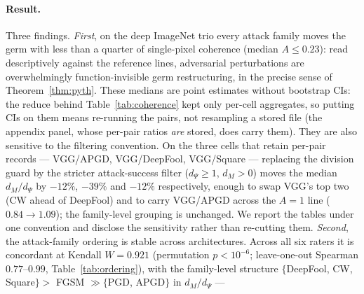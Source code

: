 \paragraph{Result.}
Three findings. \emph{First}, on the deep ImageNet trio every attack
family moves the germ with less than a quarter of single-pixel coherence
(median $A\le0.23$): read descriptively against the reference lines,
adversarial perturbations are overwhelmingly function-invisible germ
restructuring, in the precise sense of Theorem~\ref{thm:pyth}.
These
medians are point estimates without bootstrap CIs: the reduce behind
Table~\ref{tab:coherence} kept only per-cell aggregates, so putting CIs on
them means re-running the pairs, not resampling a stored file (the appendix
panel, whose per-pair ratios \emph{are} stored, does carry them). They are
also sensitive to the filtering convention. On the three cells that retain
per-pair records --- VGG/APGD, VGG/DeepFool, VGG/Square --- replacing the
division guard by the stricter attack-success filter ($d_\Psi\ge1$, $d_M>0$)
moves the median $d_M/d_\Psi$ by $-12\%$, $-39\%$ and $-12\%$ respectively,
enough to swap VGG's top two (CW ahead of DeepFool) and to carry VGG/APGD
across the $A=1$ line ($0.84 \to 1.09$); the family-level grouping is
unchanged. We report the tables under one convention and disclose the
sensitivity rather than re-cutting them. \emph{Second}, the
attack-family ordering is stable across architectures. Across all six
raters it is concordant at Kendall $W=0.921$ (permutation $p<10^{-6}$;
leave-one-out Spearman $0.77$--$0.99$, Table~\ref{tab:ordering}), with the
family-level structure
$\{$DeepFool, CW, Square$\}>$ FGSM $\gg\{$PGD, APGD$\}$ in $d_M/d_\Psi$ ---
